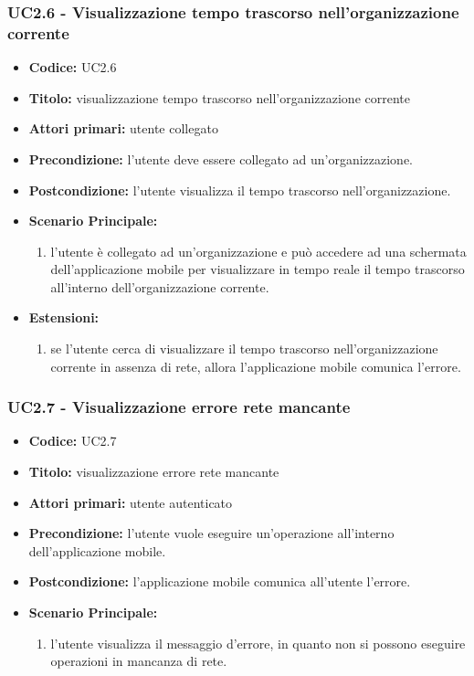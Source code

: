 \documentclass[casi-duso]{subfiles}
\begin{document}
\subsubsection{UC2.6 - Visualizzazione tempo trascorso nell'organizzazione corrente}
\label{subsub:uc2.6utente}
\begin{itemize}
  \item \textbf{Codice:} UC2.6
  \item \textbf{Titolo:} visualizzazione tempo trascorso nell'organizzazione corrente
  \item \textbf{Attori primari:} utente collegato
  \item \textbf{Precondizione:} l'utente deve essere collegato ad un'organizzazione.
  \item \textbf{Postcondizione:} l'utente visualizza il tempo trascorso nell'organizzazione.
  \item \textbf{Scenario Principale:}
  \begin{enumerate}
    \item l'utente è collegato ad un'organizzazione e può accedere ad una schermata dell'applicazione mobile per visualizzare in tempo reale il tempo trascorso all'interno 
    dell'organizzazione corrente.
  \end{enumerate}
  \item \textbf{Estensioni:} 
  \begin{enumerate}
    \item se l'utente cerca di visualizzare il tempo trascorso nell'organizzazione corrente in assenza di rete, allora l'applicazione mobile comunica l'errore.
  \end{enumerate}
\end{itemize}

\subsubsection{UC2.7 - Visualizzazione errore rete mancante}
\label{subsub:uc2.7utente}
\begin{itemize}
  \item \textbf{Codice:} UC2.7
  \item \textbf{Titolo:} visualizzazione errore rete mancante
  \item \textbf{Attori primari:} utente autenticato
  \item \textbf{Precondizione:} l'utente vuole eseguire un'operazione all'interno dell'applicazione mobile.
  \item \textbf{Postcondizione:} l'applicazione mobile comunica all'utente l'errore.
  \item \textbf{Scenario Principale:}
  \begin{enumerate}
    \item l'utente visualizza il messaggio d'errore, in quanto non si possono eseguire operazioni in mancanza di rete.
  \end{enumerate}
\end{itemize}
\end{document}
